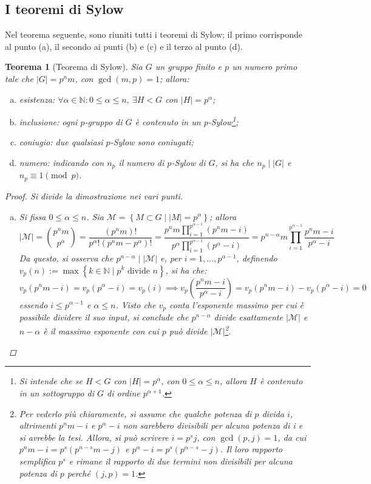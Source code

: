 \documentclass[11pt]{scrartcl}
\theoremstyle{style1}
\newtheorem{teorema}{Teorema}[section]
\numberwithin{equation}{subsection}
\begin{document}
\subsection{I teoremi di Sylow}
Nel teorema seguente, sono riuniti tutti i teoremi di Sylow; il primo corrisponde al punto (a), il secondo ai punti (b) e (c) e il terzo al punto (d).
\begin{teorema}
	[Teorema di Sylow]
	Sia $G$ un gruppo finito e $p$ un numero primo tale che $\lvert G \rvert =p^n m$, con $\operatorname{gcd}(m,p) =1$; allora:
	\begin{enumerate}[(a).]
		\item \textit{esistenza}: $\forall \alpha \in \mathbb{N} : 0\le \alpha \le n, \ \exists H < G$ con $\lvert H \rvert = p^\alpha $;
		\item \textit{inclusione}: ogni $p$-gruppo di $G$ \`e contenuto in un $p$-Sylow\footnote{Si intende che se $H < G$ con $\lvert H \rvert = p^\alpha $, con $0\le \alpha\le n $, allora $H$ \`e contenuto in un sottogruppo di $G$ di ordine $p^{\alpha  + 1} $.};
		\item \textit{coniugio}: due qualsiasi $p$-Sylow sono coniugati;
		\item \textit{numero}: indicando con $n_p$ il numero di $p$-Sylow di $G$, si ha che $n_p  \mid |G|$ e $n_p \equiv 1 \pmod{p} $.
	\end{enumerate}
	\begin{proof}
		Si divide la dimostrazione nei vari punti.
		\begin{enumerate}[(a).]
			\item Si fissa $0\le \alpha \le n$. 
				Sia $\mathcal{M} = \left\{ M \subset G  \mid \lvert M \rvert = p^\alpha  \right\} $; allora 
				\[
						\lvert \mathcal{M}  \rvert =\binom{p^n m}{p^\alpha } = \frac{(p^nm)!}{p^\alpha ! (p^nm-p^\alpha )!} = \frac{\displaystyle p^n m \prod_{i=1} ^{p^{\alpha -1} } (p^n m - i)}{p^\alpha \displaystyle \prod_{i=1} ^{p^{\alpha -1} } (p^{\alpha }-i) } = p^{n-\alpha } m \prod_{i=1} ^{p^{\alpha -1} } \frac{p^n m - i}{p^\alpha  -i}
				\] 
				Da questo, si osserva che $p^{n-\alpha }  \mid  |\mathcal{M} |$ e, per $i=1,\ldots,p^{\alpha -1} $, definendo $v_p(n):=\max \left\{ k \in \mathbb{N}  \mid p^k \text{ divide } n \right\} $, si ha che:
				\[
				v_p(p^nm - i) = v_p(p^\alpha -i)=v_p(i)\implies v_p\left(\frac{p^nm - i}{p^{\alpha } -i}\right) =v_p(p^nm-i) - v_p(p^\alpha  - i) = 0
				\] 
				essendo $i\le p^{\alpha -1} $ e $\alpha \le n$. Visto che $v_p$ conta l'esponente massimo per cui \`e possibile dividere il suo input, si conclude che $p^{n-\alpha } $ divide esattamente $\lvert \mathcal{M}  \rvert $ e $n-\alpha $ \`e il massimo esponente con cui $p$ pu\`o divide $\lvert \mathcal{M}  \rvert $\footnote{Per vederlo pi\`u chiaramente, si assume che qualche potenza di $p$ divida $i$, altrimenti $p^nm - i$ e $p^\alpha - i$ non sarebbero divisibili per alcuna potenza di i e si avrebbe la tesi. Allora, si pu\`o scrivere $i = p^s j$, con $\operatorname{gcd}(p,j) =1$, da cui $p^{n} m - i = p^s(p^{n-s} m - j)$ e $p^\alpha - i = p^s (p^{\alpha - s} - j)$. Il loro rapporto semplifica $p^s$ e rimane il rapporto di due termini non divisibili per alcuna potenza di $p$ perch\'e $(j,p) = 1$.}.


\end{enumerate}
\end{proof}
\end{teorema}
\end{document}
